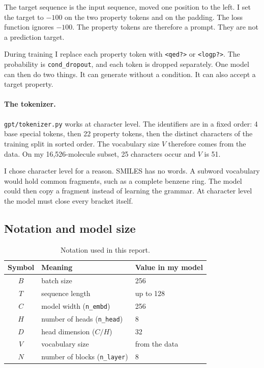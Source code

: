 \documentclass[11pt,a4paper]{article}
\newcommand{\code}[1]{\texttt{#1}}
\begin{document}
The target sequence is the input sequence, moved one position to the left. I set the target to
$-100$ on the two property tokens and on the padding. The loss function ignores $-100$. The
property tokens are therefore a prompt. They are not a prediction target.

During training I replace each property token with \code{<qed?>} or \code{<logp?>}. The
probability is \code{cond\_dropout}, and each token is dropped separately. One model can then do
two things. It can generate without a condition. It can also accept a target property.

\paragraph{The tokenizer.} \code{gpt/tokenizer.py} works at character level. The identifiers are
in a fixed order: 4 base special tokens, then 22 property tokens, then the distinct characters of
the training split in sorted order. The vocabulary size $V$ therefore comes from the data. On my
16{,}526-molecule subset, 25 characters occur and $V$ is 51.

I chose character level for a reason. SMILES has no words. A subword vocabulary would hold common
fragments, such as a complete benzene ring. The model could then copy a fragment instead of
learning the grammar. At character level the model must close every bracket itself.

\subsection{Notation and model size}

\begin{table}[htbp]\centering
\begin{tabular}{@{}cll@{}}
\toprule
\textbf{Symbol} & \textbf{Meaning} & \textbf{Value in my model} \\
\midrule
$B$ & batch size & 256 \\
$T$ & sequence length & up to 128 \\
$C$ & model width (\code{n\_embd}) & 256 \\
$H$ & number of heads (\code{n\_head}) & 8 \\
$D$ & head dimension ($C/H$) & 32 \\
$V$ & vocabulary size & from the data \\
$N$ & number of blocks (\code{n\_layer}) & 8 \\
\bottomrule
\end{tabular}
\caption{Notation used in this report.}
\end{table}
\end{document}
